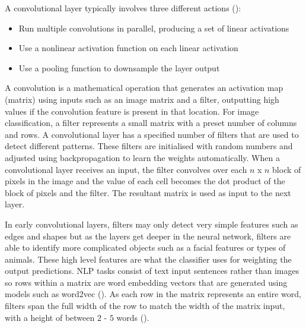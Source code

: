 A convolutional layer typically involves three different actions (\cite{goodfellow_deep_learning_2016}):
\begin{itemize}
    \item Run multiple convolutions in parallel, producing a set of linear activations
    \item Use a nonlinear activation function on each linear activation
    \item Use a pooling function to downsample the layer output
\end{itemize}


A convolution is a mathematical operation that generates an activation map (matrix) using inputs such as an image matrix and a filter, outputting high values if the convolution feature is present in that location. For image classification, a filter represents a small matrix with a preset number of columns and rows.
A convolutional layer has a specified number of filters that are used to detect different patterns. These filters are initialised with random numbers and adjusted using backpropagation to learn the weights automatically.
When a convolutional layer receives an input, the filter convolves over each $n$ x $n$ block of pixels in the image and the value of each cell becomes the dot product of the block of pixels and the filter. The resultant matrix is used as input to the next layer.

In early convolutional layers, filters may only detect very simple features such as edges and shapes but as the layers get deeper in the neural network, filters are able to identify more complicated objects such as a facial features or types of animals. These high level features are what the classifier uses for weighting the output predictions.
\acrshort{NLP} tasks consist of text input sentences rather than images so rows within a matrix are word embedding vectors that are generated using models such as word2vec (\cite{mikolov_word2vec_2013}). 
As each row in the matrix represents an entire word, filters span the full width of the row to match the width of the matrix input, with a height of between $2$ - $5$ words (\cite{lopez_deep_2017}).

